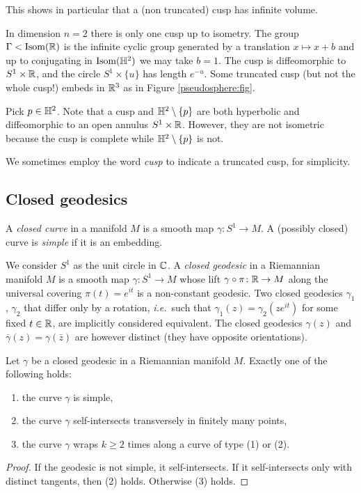 This shows in particular that a (non truncated) cusp has infinite volume.

\begin{example}
In dimension $n=2$ there is only one cusp up to isometry. The group $\Gamma<{\rm Isom}(\mathbb{R})$ is the infinite cyclic group generated by a translation $x\mapsto x+b$ and up to conjugating in ${\rm Isom}(\mathbb{H}^2)$ we may take $b=1$. The cusp is diffeomorphic to $S^1\times \mathbb{R}$, and the circle $S^1\times \{u\}$ has length $e^{-u}$. Some truncated cusp (but not the whole cusp!) embeds in $\mathbb{R}^3$ as in Figure \ref{pseudosphere:fig}.
\end{example}
\begin{rem}
Pick $p\in \mathbb{H}^2$. Note that a cusp and $\mathbb{H}^2\setminus \{p\}$ are both hyperbolic and diffeomorphic to an open annulus $S^1\times \mathbb{R}$. However, they are not isometric because the cusp is complete while $\mathbb{H}^2\setminus \{p\}$ is not.
\end{rem}

We sometimes employ the word \emph{cusp} to indicate a truncated cusp, for simplicity.

\subsection{Closed geodesics}
A \emph{closed curve} in a manifold $M$ is a smooth map $\gamma\colon S^1 \to M$. A (possibly closed) curve is \emph{simple} if it is an embedding.

We consider $S^1$ as the unit circle in $\mathbb{C}$. A \emph{closed geodesic} in a Riemannian manifold $M$ is a smooth map $\gamma\colon S^1 \to M$ whose lift $\gamma\circ \pi\colon \mathbb{R} \to M$ along the universal covering $\pi(t) = e^{i t}$ is a non-constant geodesic. 
Two closed geodesics $\gamma_1$, $\gamma_2$ that differ only by a rotation, \emph{i.e.}~such that $\gamma_1(z) = \gamma_2(ze^{it})$ for some fixed $t\in\mathbb{R}$, are implicitly considered equivalent. The closed geodesics $\gamma(z)$ and $\overline\gamma(z) = \gamma(\bar z)$ are however distinct (they have opposite orientations).

\begin{prop} \label{closed:geodesic:prop}
Let $\gamma$ be a closed geodesic in a Riemannian manifold $M$. Exactly one of the following holds:
\begin{enumerate}
\item the curve $\gamma$ is simple,
\item the curve $\gamma$ self-intersects transversely in finitely many points,
\item the curve $\gamma$ wraps $k\geqslant 2$ times along a curve of type (1) or (2).
\end{enumerate}
\end{prop}
\begin{proof}
If the geodesic is not simple, it self-intersects. If it self-intersects only with distinct tangents, then (2) holds. Otherwise (3) holds.
\end{proof}

